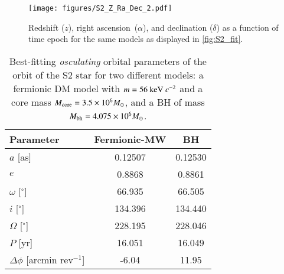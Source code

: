 \documentclass[referee]{aa} %
\begin{document}
\begin{figure}
   \texttt{[image: figures/S2\_Z\_Ra\_Dec\_2.pdf]}
   \caption{Redshift ($z$), right ascension~($\alpha$), and declination ($\delta$) as a function of time epoch for the same models as
   displayed in \cref{fig:S2_fit}.}
   \label{fig:S2_fit_b}
\end{figure}

\begin{table}[t]
\caption{Best-fitting \textit{osculating} orbital parameters of the orbit of the S2 star for two different models: a fermionic DM model with $m=56~{\rm keV}~c^{-2}$ and a core mass $M_{\rm{core}}=3.5\times 10^6 M_\odot$, and a BH of mass  $M_{\rm bh}=4.075\times 10^6 M_\odot$.}
\centering
\begin{tabular}{lcc}
\hline
Parameter & Fermionic-MW & BH \\
\hline
$a$ [as] & 0.12507 & 0.12530 \\
$e$ & 0.8868 & 0.8861 \\
$\omega$ [$^{\circ}$] & 66.935 & 66.505 \\
$i$ [$^{\circ}$] & 134.396 & 134.440 \\
$\Omega$ [$^{\circ}$] & 228.195 & 228.046 \\
$P$ [yr] & 16.051 & 16.049 \\
$\Delta \phi$ [arcmin rev$^{-1}$] & -6.04 & 11.95 \\
\hline
\end{tabular}
\label{tab:S2}
\end{table}
%
\end{document}
